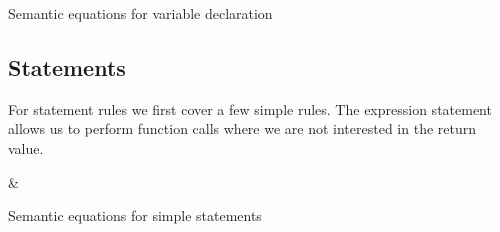 \begin{table}[H]
\begin{semanticequations}
 \seSpace
\end{semanticequations}
\caption{Semantic equations for variable declaration}
\label{cstr:variabledeclaration}
\end{table}

\subsection{Statements}
For statement rules we first cover a few simple rules.
The expression statement allows us to perform function calls where we are not interested in the return value.

\begin{table}[H]
\begin{semanticequations}
&\semeq{\iS}{\varepsilon}{\ienvL \; \ienvF}{(\emptyset, \ienvL)} \seSpace
 \seSpace
\end{semanticequations}
\caption{Semantic equations for simple statements}
\label{cstr:statements}
\end{table}

